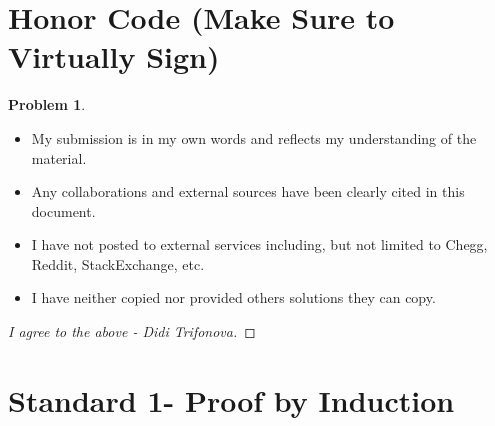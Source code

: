 \documentclass[11pt]{article}
\theoremstyle{definition}
\theoremstyle{definition}
\newtheorem{required}{Problem}
\theoremstyle{definition}
\begin{document}
\section{Honor Code (Make Sure to Virtually Sign)} \label{HonorCode}

\begin{required}
\begin{itemize}
\item My submission is in my own words and reflects my understanding of the material.
\item Any collaborations and external sources have been clearly cited in this document.
\item I have not posted to external services including, but not limited to Chegg, Reddit, StackExchange, etc.
\item I have neither copied nor provided others solutions they can copy.
\end{itemize}

\end{required}

\begin{proof}[I agree to the above - Didi Trifonova]
\end{proof}


\newpage
\section{Standard 1- Proof by Induction}
\end{document}
